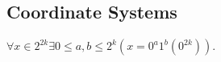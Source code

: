 \documentclass[11pt]{book}
\theoremstyle{pleasant}
\newtheorem{proposition}{Proposition}
\newcommand{\0}{\underline{0}}
\newcommand{\1}{\underline{1}}
\newcommand{\2}{\underline{2}}
\renewcommand{\S}{\mathcal{S}}
\begin{document}






\subsection*{Coordinate Systems}
$\forall x \in 2^{2k} \exists 0 \leq a, b \leq 2^k (x = 0^a 1^b(0^{2k}))$.
\end{document}
